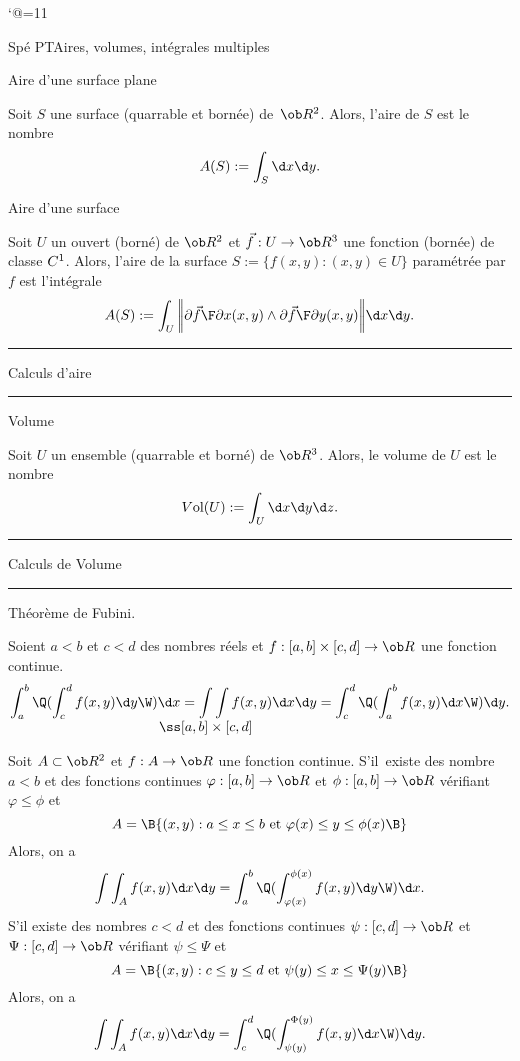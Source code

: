 \catcode`@=11\relax



\vglue-10mm\centerline{Spé PT\hfill Aires, volumes, intégrales multiples\hfill}
\bigskip

\Concept Aire d'une surface plane 

\Definition [] Soit $S$ une surface (quarrable et bornée) de~$\ob R^2$. 
Alors, l'aire de $S$ est le nombre 
$$
\sc A(S):=\int_S\d x\d y. 
$$

\Concept Aire d'une surface

\Definition []Soit $U$ un ouvert (borné) de $\ob R^2$ et $\vec f:U\to\ob R^3$ 
une fonction (bornée) de classe $\sc C^1$. Alors, l'aire de la surface 
$S:=\{f(x,y):(x,y)\in U\}$ 
paramétrée par $f$ est l'intégrale 
$$
\sc A(S):=\int_U\bigg|\!\bigg|{\partial \vec f\F\partial x}(x,y)\wedge{\partial\vec f\F\partial y}(x,y)\bigg|\!\bigg|\d x\d y. 
$$

\hrule
\centerline{Calculs d'aire}
\hrule
{}
\bigskip

\bigskip
{}
\bigskip
{}
\bigskip

\bigskip
{}
\bigskip
{}
\bigskip

\bigskip
{}
\bigskip
{}
\bigskip

\bigskip
\Concept Volume

\Definition []Soit $U$ un ensemble (quarrable et borné) de $\ob R^3$. Alors, le volume de $U$ est le nombre
$$
\sc V\mbox{ol}(U):=\int_U\d x\d y\d z. 
$$

\hrule
\centerline{Calculs de Volume}
\hrule
\bigskip


\bigskip

\bigskip
{}
\bigskip
{}
\bigskip
{}
\bigskip
{}
\bigskip
{}

\Concept Théorème de Fubini. 

\Theoreme [Title=Théorème de Fubini]
Soient $a< b$ et $c<d$ des nombres réels et $f:[a,b]\times[c,d]\to\ob R$ une fonction continue. 
$$
\int_a^b\Q(\int_c^df(x,y)\d y\W)\d x=\int\int\limits_{\llap{$\ss[a,b]\times[c,d]$}}f(x,y)\d x\d y=\int_c^d\Q(\int_a^bf(x,y)\d x\W)\d y.
$$

\Theoreme [Index=Theoreme@Théorème!de Fubini;Title=Théorème de Fubini {\it généralisé}]
Soit $A\subset \ob R^2$ et $f:A\to\ob R$ une fonction continue. S'il~existe 
des nombre $a< b$ et des fonctions continues $\varphi:[a,b]\to\ob R$ et $\phi:[a,b]\to\ob R$ vérifiant $\varphi\le \phi$ et 
$$
A=\B\{(x,y):a\le x\le b\mbox{ et }\varphi(x)\le y\le \phi(x)\B\}
$$
Alors, on a 
$$
\int\int_Af(x,y)\d x\d y=\int_a^b\Q(\int_{\varphi(x)}^{\phi(x)}f(x,y)\d y\W)\d x.
$$
S'il existe 
des nombres $c<d$ et des fonctions continues $\psi:[c,d]\to\ob R$ et $\Psi:[c,d]\to\ob R$ vérifiant $\psi\le\Psi$ et 
$$
A=\B\{(x,y):c\le y\le d\mbox{ et }\psi(y)\le x\le \Psi(y)\B\}
$$
Alors, on a 
$$
\int\int_Af(x,y)\d x\d y=\int_c^d\Q(\int_{\psi(y)}^{\Phi(y)}f(x,y)\d x\W)\d y.
$$


